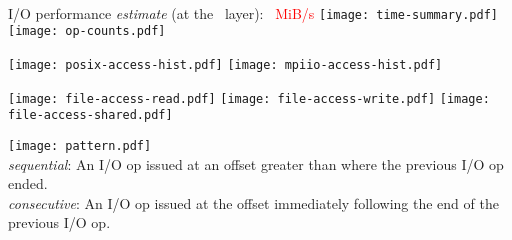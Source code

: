 \documentclass[11pt,letterpaper,twocolumn]{article}
\begin{document}
\selectfont

\pagestyle{fancy}

\ifdefined\incompletelog
{}
\newpage
\fi

\begin{figure*}[!h]
\centering
\subfigure
{
    
}\\
\vspace{1em}
I/O performance \emph{estimate} (at the \perflayer \ layer): \textcolor{red}{\perfest \ MiB/s}
\vspace{3em}
\subfigure
{
    \texttt{[image: time-summary.pdf]}
}
\subfigure
{
    \texttt{[image: op-counts.pdf]}
}
\end{figure*}

\begin{figure*}[!h]
\centering
\subfigure
{
    \texttt{[image: posix-access-hist.pdf]}
}
\ifdefined\inclmpiio
\subfigure
{
    \texttt{[image: mpiio-access-hist.pdf]}
}
\fi
\end{figure*}

\begin{figure*}[!h]
\centering
\subfigure
{
    
}
\subfigure
{
    
}
\end{figure*}

\begin{figure*}[!h]
\centering
\subfigure
{
    \texttt{[image: file-access-read.pdf]}
}
\subfigure
{
    \texttt{[image: file-access-write.pdf]}
}
\subfigure
{
    \texttt{[image: file-access-shared.pdf]}
}
\subfigure
{
    
}
\subfigure
{
    
}
\end{figure*}

\begin{figure*}[!h]
\centering
\subfigure
{
    \texttt{[image: pattern.pdf]}
}
\scriptsize
\\ \textit{sequential}: An I/O op issued at an offset greater than where the previous I/O op ended.
\\ \textit{consecutive}: An I/O op issued at the offset immediately following the end of the previous I/O op. \\
\normalsize
\subfigure
{
    
}
\end{figure*}
\end{document}
